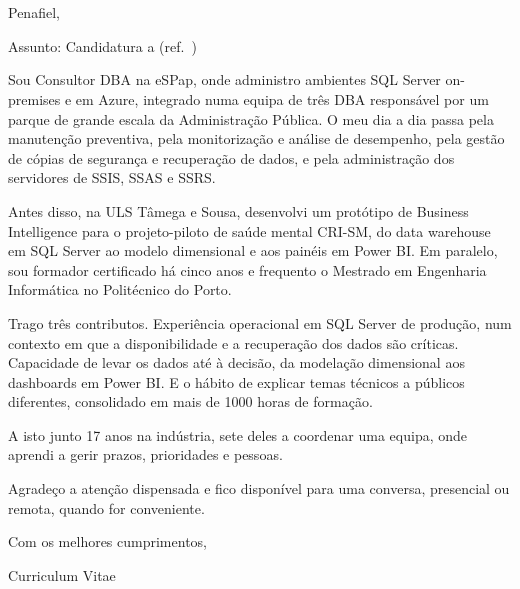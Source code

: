 \documentclass[11pt]{article}
\begin{document}
\raggedright
\cabecalho
\vspace{6pt}

{\robotobold \destinatario}\\
{\color{cinza}\empresa\\ \moradaempresa}

\vspace{2pt}
{\color{cinza}Penafiel, \datapt}

{\robotobold Assunto:} Candidatura a \funcao{} (ref.\ )

\saudacao

Sou Consultor DBA na eSPap, onde administro ambientes SQL Server on-premises e em Azure, integrado numa equipa de três DBA responsável por um parque de grande escala da Administração Pública. O meu dia a dia passa pela manutenção preventiva, pela monitorização e análise de desempenho, pela gestão de cópias de segurança e recuperação de dados, e pela administração dos servidores de SSIS, SSAS e SSRS.

Antes disso, na ULS Tâmega e Sousa, desenvolvi um protótipo de Business Intelligence para o projeto-piloto de saúde mental CRI-SM, do data warehouse em SQL Server ao modelo dimensional e aos painéis em Power BI. Em paralelo, sou formador certificado há cinco anos e frequento o Mestrado em Engenharia Informática no Politécnico do Porto.


Trago três contributos. Experiência operacional em SQL Server de produção, num contexto em que a disponibilidade e a recuperação dos dados são críticas. Capacidade de levar os dados até à decisão, da modelação dimensional aos dashboards em Power BI. E o hábito de explicar temas técnicos a públicos diferentes, consolidado em mais de 1000 horas de formação.

A isto junto 17 anos na indústria, sete deles a coordenar uma equipa, onde aprendi a gerir prazos, prioridades e pessoas.

Agradeço a atenção dispensada e fico disponível para uma conversa, presencial ou remota, quando for conveniente.

Com os melhores cumprimentos,

\vspace{14pt}
{\robotobold \CVnome{} \CVapelido}

\vfill
{\small\color{cinza}{\robotobold Anexo:} Curriculum Vitae}
\end{document}
